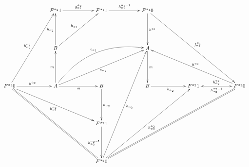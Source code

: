 \documentclass[12pt]{article}
\begin{document}
\pagestyle{empty}

\begin{align*}
  \vcenter{
    \xymatrix@=60pt{
      &
      F^{\alpha_2} 1
      \ar@{->}[r]^{g^{\alpha_2}_{\alpha_1}}
      &
      F^{\alpha_1} 1
      \ar@{->}[r]^{{h^{\alpha_1}_{\alpha_1}}^{-1}}
      &
      F^{\alpha_1} 0
      \ar@{->}[rrdd]^{f^{\alpha_1}_{\alpha_2}}
      \ar@{->}[d]^{h^{\alpha_1}}
      \\
      &
      B
      \ar@{->}[u]^{h_{\alpha_2}}
      \ar@{->}[ru]^{h_{\alpha_1}}
      & &
      A
      \ar@{->}[d]^{m}
      \\
      F^{\alpha_2} 0
      \ar@{->}[ruu]^{h^{\alpha_2}_{\alpha_2}}
      \ar@{->}[r]^{h^{\alpha_2}}
      \ar@{->}[rrd]_{h^{\alpha_2}_{\alpha_2}}
      \ar@{=}[rrdd]
      &
      A
      \ar@{->}[u]^{m}
      \ar@{->}[r]_{m}
      \ar@/^30pt/@{->}[rru]^{e_{\alpha_1}}
      \ar@{->}[rru]_{e_{\alpha_2}}
      &
      B
      \ar@{->}[d]^{h_{\alpha_2}}
      &
      B
      \ar@{->}[r]_{h_{\alpha_2}}
      &
      F^{\alpha_2} 1
      \ar@{<->}[r]^{h^{\alpha_2}_{\alpha_2}}_{{h^{\alpha_2}_{\alpha_2}}^{-1}}
      &
      F^{\alpha_2} 0
      \ar@{->}[llu]_{h^{\alpha_2}}
      \\
      & &
      F^{\alpha_2} 1
      \ar@{->}[d]_{{h^{\alpha_2}_{\alpha_2}}^{-1}}
      \\
      & &
      F^{\alpha_2} 0
      \ar@{->}[ruuu]_{h_{\alpha_2}}
      \ar@{->}[rruu]_{h^{\alpha_2}_{\alpha_2}}
      \ar@{=}[rrruu]
    }
  }
\end{align*}
\end{document}
